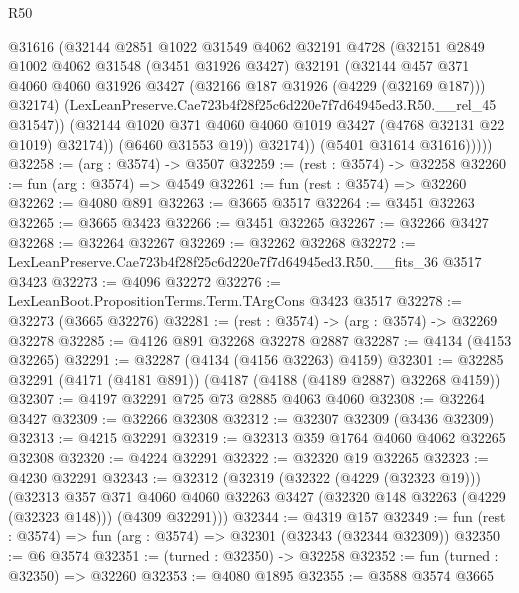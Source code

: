 \begin{lexlean}{R50}
\begin{coremodule}
                  @31616
                  (@32144
                    @2851
                    @1022
                    @31549
                    @4062
                    @32191
                    @4728
                    (@32151
                      @2849
                      @1002
                      @4062
                      @31548
                      (@3451 @31926 @3427)
                      @32191
                      (@32144
                        @457
                        @371
                        @4060
                        @4060
                        @31926
                        @3427
                        (@32166 @187 @31926 (@4229 (@32169 @187)))
                        @32174)
                      (LexLeanPreserve.Cae723b4f28f25c6d220e7f7d64945ed3.R50.__rel_45 @31547))
                    (@32144 @1020 @371 @4060 @4060 @1019 @3427 (@4768 @32131 @22 @1019) @32174))
                  (@6460 @31553 @19))
                @32174))
            (@5401 @31614 @31616)))))
@32258 := (arg : @3574) -> @3507
@32259 := (rest : @3574) -> @32258
@32260 := fun (arg : @3574) => @4549
@32261 := fun (rest : @3574) => @32260
@32262 := @4080 @891
@32263 := @3665 @3517
@32264 := @3451 @32263
@32265 := @3665 @3423
@32266 := @3451 @32265
@32267 := @32266 @3427
@32268 := @32264 @32267
@32269 := @32262 @32268
@32272 := LexLeanPreserve.Cae723b4f28f25c6d220e7f7d64945ed3.R50.__fits_36 @3517 @3423
@32273 := @4096 @32272
@32276 := LexLeanBoot.PropositionTerms.Term.TArgCons @3423 @3517
@32278 := @32273 (@3665 @32276)
@32281 := (rest : @3574) -> (arg : @3574) -> @32269 @32278
@32285 := @4126 @891 @32268 @32278 @2887
@32287 := @4134 (@4153 @32265)
@32291 := @32287 (@4134 (@4156 @32263) @4159)
@32301 := @32285 @32291 (@4171 (@4181 @891)) (@4187 (@4188 (@4189 @2887) @32268 @4159))
@32307 := @4197 @32291 @725 @73 @2885 @4063 @4060
@32308 := @32264 @3427
@32309 := @32266 @32308
@32312 := @32307 @32309 (@3436 @32309)
@32313 := @4215 @32291
@32319 := @32313 @359 @1764 @4060 @4062 @32265 @32308
@32320 := @4224 @32291
@32322 := @32320 @19 @32265
@32323 := @4230 @32291
@32343 := @32312
    (@32319
      (@32322 (@4229 (@32323 @19)))
      (@32313
        @357
        @371
        @4060
        @4060
        @32263
        @3427
        (@32320 @148 @32263 (@4229 (@32323 @148)))
        (@4309 @32291)))
@32344 := @4319 @157
@32349 := fun (rest : @3574) => fun (arg : @3574) => @32301 (@32343 (@32344 @32309))
@32350 := @6 @3574
@32351 := (turned : @32350) -> @32258
@32352 := fun (turned : @32350) => @32260
@32353 := @4080 @1895
@32355 := @3588 @3574 @3665

\end{coremodule}
\end{lexlean}
